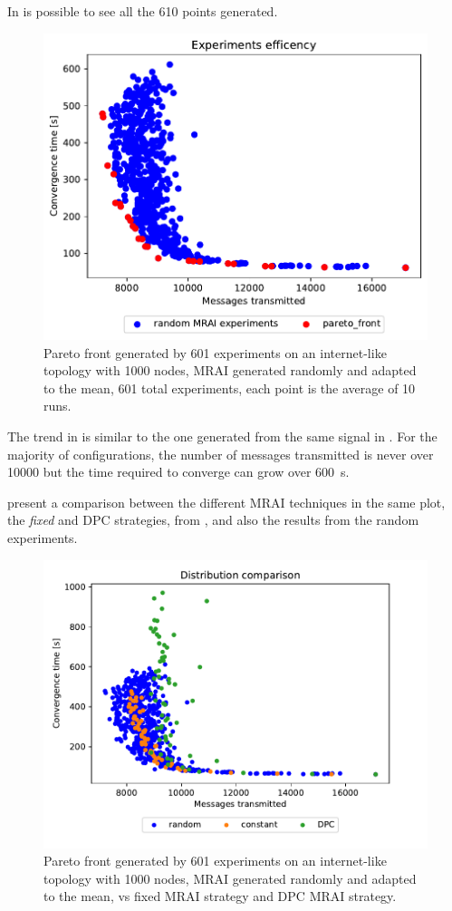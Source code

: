 In  is possible to see all the \num{610} points
generated.

\begin{figure}[h]
    \centering
    \includegraphics[width=.5\textwidth]{images/internet_like/1000/random.pdf}
	\caption{Pareto front generated by \num{601} experiments on an internet-like
	topology with \num{1000} nodes, \ac{MRAI} generated randomly and adapted to
		the mean, \num{601} total experiments, each point is the average of
		\num{10} runs.}
    \label{fig:random_pareto_front}
\end{figure}

The trend in  is similar to the one
generated from the same signal in .
For the majority of configurations, the number of messages transmitted is never
over \num{10000} but the time required to converge can grow over \SI{600}{\second}.

 present a comparison between the different
\ac{MRAI} techniques in the same plot, the \textit{fixed} and \ac{DPC} strategies,
from
,
and also the results from the random experiments.

\begin{figure}[h]
    \centering
    \includegraphics[width=.57\textwidth]{images/internet_like/1000/random_vs_all.pdf}
	\caption{Pareto front generated by \num{601} experiments on an internet-like
	topology with \num{1000} nodes, \ac{MRAI} generated randomly and adapted to
		the mean, vs fixed \ac{MRAI} strategy and \ac{DPC} \ac{MRAI} strategy.}
    \label{fig:pareto_comparison}
\end{figure}

